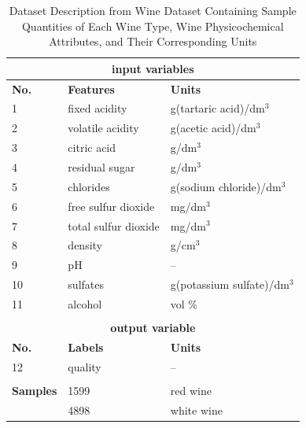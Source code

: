 \renewcommand{\arraystretch}{1}
\begin{table}[!htp]
\centering
\caption{Dataset Description from Wine Dataset Containing Sample Quantities of Each Wine Type, Wine Physicochemical Attributes, and Their Corresponding Units}
\begin{tabular}{|l|l|l|}
\multicolumn{3}{c}{\textbf{input variables}} \\
\hline
\textbf{No.} & \textbf{Features} & \textbf{Units} \\
\hline
1 & fixed acidity & g(tartaric acid)/dm$^3$ \\
2 & volatile acidity & g(acetic acid)/dm$^3$ \\
3 & citric acid & g/dm$^3$ \\
4 & residual sugar & g/dm$^3$ \\
5 & chlorides & g(sodium chloride)/dm$^3$ \\
6 & free sulfur dioxide & mg/dm$^3$ \\
7 & total sulfur dioxide & mg/dm$^3$ \\
8 & density & g/cm$^3$ \\
9 & pH & -- \\
10 & sulfates & g(potassium sulfate)/dm$^3$ \\
11 & alcohol & vol \% \\
\hline
\multicolumn{3}{c}{} \\
\multicolumn{3}{c}{\textbf{output variable}} \\
\hline
\textbf{No.} & \textbf{Labels }& \textbf{Units }\\
\hline
12 & quality & -- \\
\hline
\multicolumn{3}{c}{} \\
\hline
\textbf{Samples} & 1599 & red wine \\
        & 4898 & white wine \\
\hline
\end{tabular}
\label{features_table}
\end{table}
